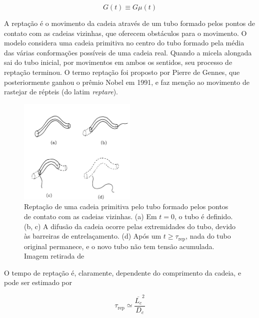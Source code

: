 		\begin{equation}
			G(t) \equiv G \mu(t)	
			\label{eqn:decaimento_G_t}
		\end{equation} %
		
		A reptação é o movimento da cadeia através de um tubo formado pelos pontos de contato com as cadeias vizinhas, que oferecem obstáculos para o movimento. O modelo considera uma cadeia primitiva no centro do tubo formado pela média das várias conformações possíveis de uma cadeia real. \cite{Goodwin2008} Quando a micela alongada sai do tubo inicial, por movimentos em ambos os sentidos, seu processo de reptação terminou. O termo reptação foi proposto por Pierre de Gennes\cite{DeGennes1971, Gennes1983}, 
		que posteriormente ganhou o prêmio Nobel em 1991\cite{DeGennesNobel}, e faz menção ao movimento de rastejar de répteis (do latim \emph{reptare}). \cite{Goodwin2008}

		\begin{figure}[h]
			\centering
			\includegraphics[width=0.5\textwidth]{imagens/artigos/reptacao_cates_1987}
			\caption{Reptação de uma cadeia primitiva pelo tubo formado pelos pontos de contato com as cadeias vizinhas. (a) Em \(t=0\), o tubo é definido. (b, c) A difusão da cadeia ocorre pelas extremidades do tubo, devido às barreiras de entrelaçamento. (d) Após um \(t \ge \tau_\mathrm{rep}\), nada do tubo original permanece, e o novo tubo não tem tensão acumulada. Imagem retirada de \citeauthor{Cates1987}}
			\label{fig:reptacao_cates1987}
		\end{figure}
		
		O tempo de reptação é, claramente, dependente do comprimento da cadeia, e pode ser estimado por\cite{Cates1990}
		
		\begin{equation}
			\tau_\mathrm{rep} \simeq \frac{\overline{L_c}^2}{D_c}
			\label{eqn:tau_rep_comprimento_contorno}
		\end{equation} %
		
